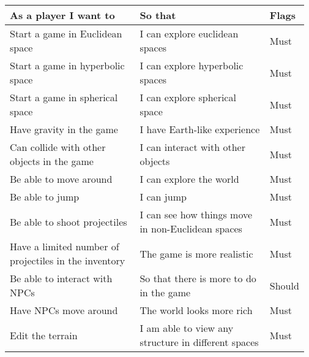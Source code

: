 \documentclass[12pt]{article}
\begin{document}
\begin{table}[H]
	\begin{tabular}{p{0.45\linewidth}|p{0.45\linewidth}|p{0.07\linewidth}}
		\hline
		\textbf{As a player I want to}                            & \textbf{So that}                                                   & \textbf{Flags} \\ \hline
		Start a game in Euclidean space                           & I can explore euclidean spaces                                     & Must           \\ \hline
		Start a game in hyperbolic space                          & I can explore hyperbolic spaces                                    & Must           \\ \hline
		Start a game in spherical space                           & I can explore spherical space                                      & Must           \\ \hline
		Have gravity in the game                                  & I have Earth-like experience                                       & Must           \\ \hline
		Can collide with other objects in the game                & I can interact with other objects                                  & Must           \\ \hline
		Be able to move around                                    & I can explore the world                                            & Must           \\ \hline
		Be able to jump                                           & I can jump                                                         & Must           \\ \hline
		Be able to shoot projectiles                              & I can see how things move in non-Euclidean spaces                  & Must           \\ \hline
		Have a limited number of projectiles in the inventory     & The game is more realistic                                         & Must           \\ \hline
		Be able to interact with NPCs                             & So that there is more to do in the game                            & Should         \\ \hline
		Have NPCs move around                                     & The world looks more rich                                          & Must           \\ \hline
		Edit the terrain                                          & I am able to view any structure in different spaces                & Must           \\ \hline

\end{tabular}
\end{table}
\end{document}
